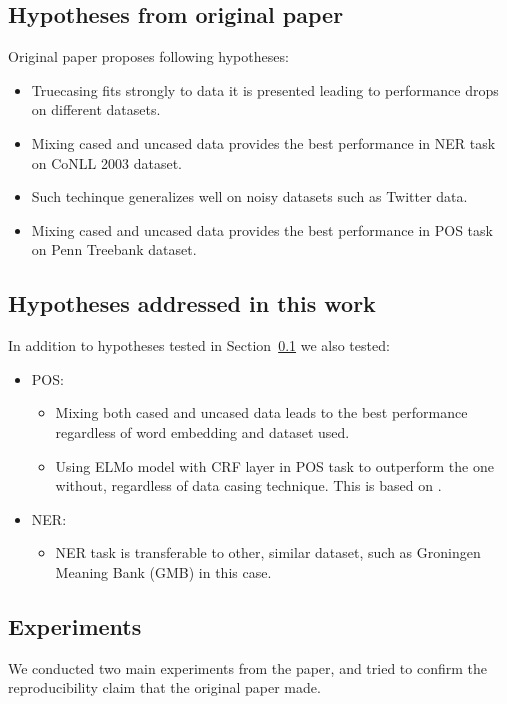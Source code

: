 \documentclass[11pt,a4paper]{article}
\begin{document}
\subsection{Hypotheses from original paper}
\label{sec:original_hypotheses}
Original paper proposes following hypotheses:
\begin{itemize}
    \item Truecasing fits strongly to data it is presented leading to performance drops on different datasets.
    \item Mixing cased and uncased data provides the best performance in NER task on CoNLL 2003 dataset.
    \item Such techinque generalizes well on noisy datasets such as Twitter data.
    \item Mixing cased and uncased data provides the best performance in POS task on Penn Treebank dataset.
\end{itemize}

\subsection{Hypotheses addressed in this work}
\label{sec:current_hypotheses}
In addition to hypotheses tested in Section~\ref{sec:original_hypotheses} we also tested:
\begin{itemize}
    \item POS:
    \begin{itemize}
        \item Mixing both cased and uncased data leads to the best performance regardless of word embedding and dataset used.
        \item Using ELMo model with CRF layer in POS task to outperform the one without, regardless of data casing technique. This is based on \cite{BiLSTM-CRF}.
    \end{itemize}
    \item NER:
    \begin{itemize}
        \item NER task is transferable to other, similar dataset, such as Groningen Meaning Bank (GMB) in this case.
    \end{itemize}
\end{itemize}


\subsection{Experiments}
We conducted two main experiments from the paper, and tried to confirm the reproducibility claim that the original paper made.
\end{document}
